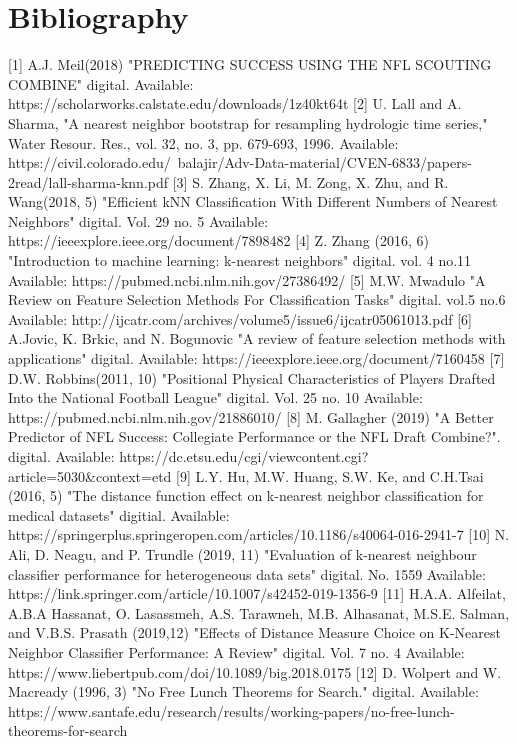 \documentclass[confrence]{IEEEtran}
\begin{document}
\section*{Bibliography}
 [1] A.J. Meil(2018) "PREDICTING SUCCESS USING THE NFL SCOUTING COMBINE" digital. Available: https://scholarworks.calstate.edu/downloads/1z40kt64t
[2] U. Lall and A. Sharma, "A nearest neighbor bootstrap for resampling hydrologic time series," Water Resour. Res., vol. 32, no. 3, pp. 679-693, 1996. Available: https://civil.colorado.edu/~balajir/Adv-Data-material/CVEN-6833/papers-2read/lall-sharma-knn.pdf
[3] S. Zhang, X. Li, M. Zong, X. Zhu, and R. Wang(2018, 5) "Efficient kNN Classification With Different Numbers of Nearest Neighbors" digital. Vol. 29 no. 5 Available: https://ieeexplore.ieee.org/document/7898482
[4] Z. Zhang (2016, 6) "Introduction to machine learning: k-nearest neighbors" digital. vol. 4 no.11 Available: https://pubmed.ncbi.nlm.nih.gov/27386492/
[5] M.W. Mwadulo "A Review on Feature Selection Methods For Classification Tasks" digital. vol.5 no.6 Available: http://ijcatr.com/archives/volume5/issue6/ijcatr05061013.pdf
[6] A.Jovic, K. Brkic, and N. Bogunovic "A review of feature selection methods with applications" digital. Available: https://ieeexplore.ieee.org/document/7160458
[7] D.W. Robbins(2011, 10) "Positional Physical Characteristics of Players Drafted Into the National Football League" digital. Vol. 25 no. 10 Available: https://pubmed.ncbi.nlm.nih.gov/21886010/
[8] M. Gallagher (2019) "A Better Predictor of NFL Success: Collegiate Performance or the NFL Draft Combine?". digital. Available: https://dc.etsu.edu/cgi/viewcontent.cgi?article=5030&context=etd
[9] L.Y. Hu, M.W. Huang, S.W. Ke, and C.H.Tsai (2016, 5) "The distance function effect on k-nearest neighbor classification for medical datasets" digitial. Available: https://springerplus.springeropen.com/articles/10.1186/s40064-016-2941-7
[10] N. Ali, D. Neagu, and P. Trundle (2019, 11) "Evaluation of k-nearest neighbour classifier performance for heterogeneous data sets" digital. No. 1559  Available: https://link.springer.com/article/10.1007/s42452-019-1356-9
[11] H.A.A. Alfeilat, A.B.A Hassanat, O. Lasassmeh, A.S. Tarawneh, M.B. Alhasanat, M.S.E. Salman, and V.B.S. Prasath (2019,12) "Effects of Distance Measure Choice on K-Nearest Neighbor Classifier Performance: A Review" digital. Vol. 7 no. 4 Available: https://www.liebertpub.com/doi/10.1089/big.2018.0175
[12] D. Wolpert and W. Macready (1996, 3) "No Free Lunch Theorems for Search." digital. Available: https://www.santafe.edu/research/results/working-papers/no-free-lunch-theorems-for-search
\end{document}
